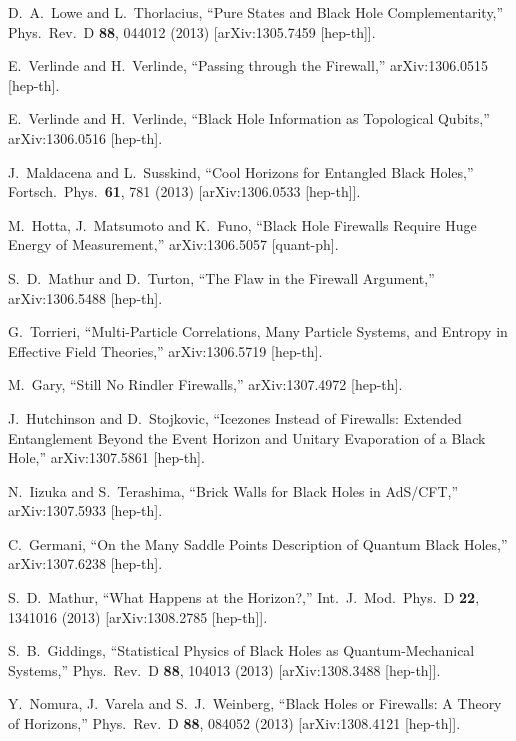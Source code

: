 \documentclass[12pt]{article}
\begin{document}
\begin{thebibliography}{99}
  D.~A.~Lowe and L.~Thorlacius,
  ``Pure States and Black Hole Complementarity,''
  Phys.\ Rev.\ D {\bf 88}, 044012 (2013)
  [arXiv:1305.7459 [hep-th]].

  E.~Verlinde and H.~Verlinde,
  ``Passing through the Firewall,''
  arXiv:1306.0515 [hep-th].

  E.~Verlinde and H.~Verlinde,
  ``Black Hole Information as Topological Qubits,''
  arXiv:1306.0516 [hep-th].

  J.~Maldacena and L.~Susskind,
  ``Cool Horizons for Entangled Black Holes,''
  Fortsch.\ Phys.\  {\bf 61}, 781 (2013)
  [arXiv:1306.0533 [hep-th]].

  M.~Hotta, J.~Matsumoto and K.~Funo,
  ``Black Hole Firewalls Require Huge Energy of Measurement,''
  arXiv:1306.5057 [quant-ph].

  S.~D.~Mathur and D.~Turton,
  ``The Flaw in the Firewall Argument,''
  arXiv:1306.5488 [hep-th].
  
  G.~Torrieri,
  ``Multi-Particle Correlations, Many Particle Systems, and Entropy in Effective Field Theories,''
  arXiv:1306.5719 [hep-th].  

  M.~Gary,
  ``Still No Rindler Firewalls,''
  arXiv:1307.4972 [hep-th].

  J.~Hutchinson and D.~Stojkovic,
  ``Icezones Instead of Firewalls: Extended Entanglement Beyond the Event Horizon and Unitary Evaporation of a Black Hole,''
  arXiv:1307.5861 [hep-th].

  N.~Iizuka and S.~Terashima,
  ``Brick Walls for Black Holes in AdS/CFT,''
  arXiv:1307.5933 [hep-th].

  C.~Germani,
  ``On the Many Saddle Points Description of Quantum Black Holes,''
  arXiv:1307.6238 [hep-th].

  S.~D.~Mathur,
  ``What Happens at the Horizon?,''
  Int.\ J.\ Mod.\ Phys.\ D {\bf 22}, 1341016 (2013)
  [arXiv:1308.2785 [hep-th]].

  S.~B.~Giddings,
  ``Statistical Physics of Black Holes as Quantum-Mechanical Systems,''
  Phys.\ Rev.\ D {\bf 88}, 104013 (2013)
  [arXiv:1308.3488 [hep-th]].

  Y.~Nomura, J.~Varela and S.~J.~Weinberg,
  ``Black Holes or Firewalls: A Theory of Horizons,''
  Phys.\ Rev.\ D {\bf 88}, 084052 (2013)
  [arXiv:1308.4121 [hep-th]].


\end{thebibliography}
\end{document}
